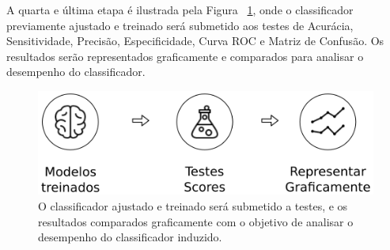 A quarta e última etapa é ilustrada pela Figura ~\ref{fig:metodologia_4}, onde o classificador previamente ajustado e treinado será submetido aos testes de Acurácia, Sensitividade, Precisão, Especificidade, Curva ROC e Matriz de Confusão. Os resultados serão representados graficamente e comparados para analisar o desempenho do classificador.
\begin{figure}[H]
\begin{center}
    \includegraphics[scale=0.75]{images/metodologia_4.png}
\end{center}
\caption{O classificador ajustado e treinado será submetido a testes, e os resultados comparados graficamente com o objetivo de analisar o desempenho do classificador induzido.}
\label{fig:metodologia_4}
\end{figure}
